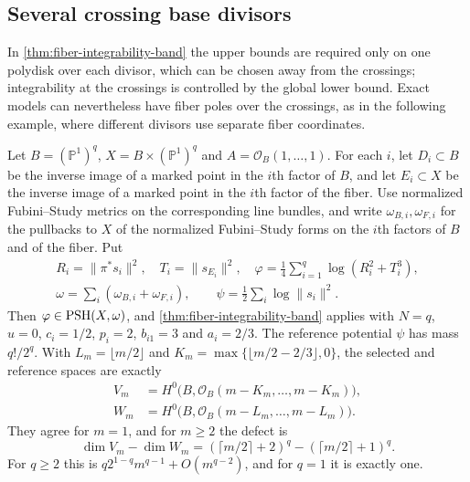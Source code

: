 \subsection{Several crossing base divisors}
\label{sec:crossing-fiber-integrability}

In \cref{thm:fiber-integrability-band} the upper bounds are required only on one polydisk over each divisor, which can be chosen away from the crossings; integrability at the crossings is controlled by the global lower bound. Exact models can nevertheless have fiber poles over the crossings, as in the following example, where different divisors use separate fiber coordinates.

\begin{example}\label{ex:crossing-fiber-sharp-error}
Let $B=(\mathbb P^1)^q$, $X=B\times(\mathbb P^1)^q$ and $A=\mathcal O_B(1,\ldots,1)$. For each $i$, let $D_i\subset B$ be the inverse image of a marked point in the $i$th factor of $B$, and let $E_i\subset X$ be the inverse image of a marked point in the $i$th factor of the fiber. Use normalized Fubini--Study metrics on the corresponding line bundles, and write $\omega_{B,i},\omega_{F,i}$ for the pullbacks to $X$ of the normalized Fubini--Study forms on the $i$th factors of $B$ and of the fiber. Put
\[
 \begin{gathered}
 R_i=\|\pi^*s_i\|^2,\quad T_i=\|s_{E_i}\|^2,\quad
 \varphi=\frac14\sum_{i=1}^q\log(R_i^2+T_i^3),\\
 \omega=\sum_i(\omega_{B,i}+\omega_{F,i}),\qquad
 \psi=\frac12\sum_i\log\|s_i\|^2.
 \end{gathered}
\]
Then $\varphi\in\mathrm{PSH}(X,\omega)$, and \cref{thm:fiber-integrability-band} applies with $N=q$, $u=0$, $c_i=1/2$, $p_i=2$, $b_{i1}=3$ and $a_i=2/3$. The reference potential $\psi$ has mass $q!/2^q$. With $L_m=\lfloor m/2\rfloor$ and $K_m=\max\{\lfloor m/2-2/3\rfloor,0\}$, the selected and reference spaces are exactly
\[
 \begin{split}
 V_m&=H^0\bigl(B,\mathcal O_B(m-K_m,\ldots,m-K_m)\bigr),\\
 W_m&=H^0\bigl(B,\mathcal O_B(m-L_m,\ldots,m-L_m)\bigr).
 \end{split}
\]
They agree for $m=1$, and for $m\geq2$ the defect is
\[
 \dim V_m-\dim W_m
       =(\lceil m/2\rceil+2)^q-(\lceil m/2\rceil+1)^q.
\]
For $q\geq2$ this is $q2^{1-q}m^{q-1}+O(m^{q-2})$, and for $q=1$ it is exactly one.
\end{example}
